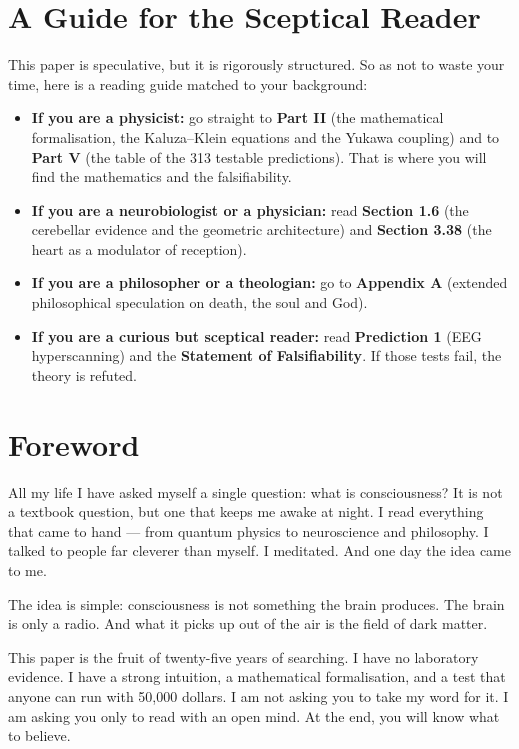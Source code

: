 \documentclass[11pt,a4paper]{article}
\begin{document}
\section*{A Guide for the Sceptical Reader}
This paper is speculative, but it is rigorously structured. So as not to waste your time, here is a reading guide matched to your background:
\begin{itemize}
    \item \textbf{If you are a physicist:} go straight to \textbf{Part II} (the mathematical formalisation, the Kaluza--Klein equations and the Yukawa coupling) and to \textbf{Part V} (the table of the 313 testable predictions). That is where you will find the mathematics and the falsifiability.
    \item \textbf{If you are a neurobiologist or a physician:} read \textbf{Section 1.6} (the cerebellar evidence and the geometric architecture) and \textbf{Section 3.38} (the heart as a modulator of reception).
    \item \textbf{If you are a philosopher or a theologian:} go to \textbf{Appendix A} (extended philosophical speculation on death, the soul and God).
    \item \textbf{If you are a curious but sceptical reader:} read \textbf{Prediction 1} (EEG hyperscanning) and the \textbf{Statement of Falsifiability}. If those tests fail, the theory is refuted.
\end{itemize}

\section*{Foreword}
All my life I have asked myself a single question: what is consciousness? It is not a textbook question, but one that keeps me awake at night. I read everything that came to hand --- from quantum physics to neuroscience and philosophy. I talked to people far cleverer than myself. I meditated. And one day the idea came to me.

The idea is simple: consciousness is not something the brain produces. The brain is only a radio. And what it picks up out of the air is the field of dark matter.

This paper is the fruit of twenty-five years of searching. I have no laboratory evidence. I have a strong intuition, a mathematical formalisation, and a test that anyone can run with 50,000 dollars. I am not asking you to take my word for it. I am asking you only to read with an open mind. At the end, you will know what to believe.
\end{document}
